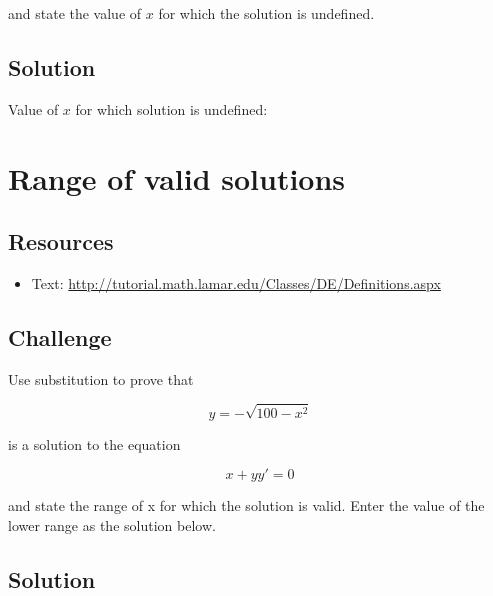 and state the value of $x$ for which the solution is undefined.

\subsection*{Solution}
Value of $x$ for which solution is undefined: \six{}




\newpage

\section{Range of valid solutions}

\subsection*{Resources}
\begin{itemize}
    \item Text: \url{http://tutorial.math.lamar.edu/Classes/DE/Definitions.aspx}
\end{itemize}

\subsection*{Challenge}

Use substitution to prove that

\begin{equation}
    y = -\sqrt{100-x^2}
\end{equation}

is a solution to the equation

\begin{equation}
    x + y y' = 0
\end{equation}

and state the range of x for which the solution is valid. Enter the value of the lower range as the solution below.

\subsection*{Solution}
\six{}

